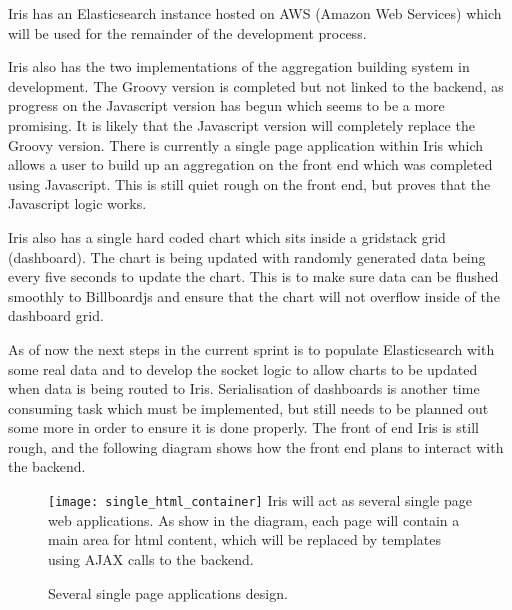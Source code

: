 \documentclass[12pt,a4paper,titlepage]{report}
\begin{document}
Iris has an Elasticsearch instance hosted on AWS (Amazon Web Services) which will be used for the remainder of the development process.

Iris also has the two implementations of the aggregation building system in development. The Groovy version is completed but not linked to the backend, as progress on the Javascript version has begun which seems to be a more promising. It is likely that the Javascript version will completely replace the Groovy version. There is currently a single page application within Iris which allows a user to build up an aggregation on the front end which was completed using Javascript. This is still quiet rough on the front end, but proves that the Javascript logic works.

Iris also has a single hard coded chart which sits inside a gridstack grid (dashboard). The chart is being updated with randomly generated data being every five seconds to update the chart. This is to make sure data can be flushed smoothly to Billboardjs and ensure that the chart will not overflow inside of the dashboard grid.

As of now the next steps in the current sprint is to populate Elasticsearch with some real data and to develop the socket logic to allow charts to be updated when data is being routed to Iris. Serialisation of dashboards is another time consuming task which must be implemented, but still needs to be planned out some more in order to ensure it is done properly. The front of end Iris is still rough, and the following diagram shows how the front end plans to interact with the backend.

\begin{figure}[H]
\begin{tcolorbox}
\texttt{[image: single\_html\_container]}
Iris will act as several single page web applications. As show in the diagram, each page will contain a main area for html content, which will be replaced by templates using AJAX calls to the backend.
\end{tcolorbox}
\caption{Several single page applications design.}
\end{figure}

\nocite{*}
\printbibliography

\clearpage
\end{document}
